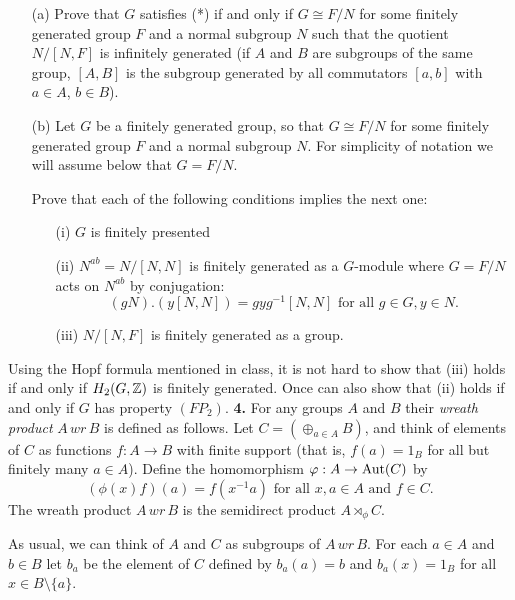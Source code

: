 \documentclass[12pt]{amsart}
\begin{document}
\begin{itemize}
\item[(a)] Prove that $G$ satisfies (*) if and only if $G\cong F/N$ for some finitely generated group $F$ and a normal subgroup $N$
such that the quotient $N/[N,F]$ is infinitely generated (if $A$ and $B$ are subgroups of the same group, $[A,B]$ is the subgroup
generated by all commutators $[a,b]$ with $a\in A$, $b\in B$).
\item[(b)] Let $G$ be a finitely generated group, so that $G\cong F/N$ for some finitely generated group $F$ and a normal subgroup $N$.
For simplicity of notation we will assume below that $G=F/N$.

\skv
\skv

Prove that each of the following conditions implies the next one:
\begin{itemize}
\item[(i)] $G$ is finitely presented
\item[(ii)] $N^{ab}=N/[N,N]$ is finitely generated as a $G$-module where $G=F/N$ acts on $N^{ab}$ by conjugation:
$$(gN).(y[N,N])=gyg^{-1}[N,N]\mbox{ for all }g\in G, y\in N.$$
\item[(iii)] $N/[N,F]$ is finitely generated as a group.
\end{itemize}
\end{itemize}
Using the Hopf formula mentioned in class, it is not hard to show that (iii) holds if and only if $H_2(G,{\mathbb Z})$ is finitely generated.
Once can also show that (ii) holds if and only if $G$ has property $(FP_2)$.
\skv
{\bf 4. } For any groups $A$ and $B$ their {\it wreath product} $A\, wr\, B$ is defined as follows.
Let $C=(\oplus_{a\in A}B)$, and think of elements of $C$ as functions $f:A\to B$ with finite support (that is, $f(a)=1_B$ for all but finitely many $a\in A$).
Define the homomorphism ${\varphi}:A\to {\rm Aut}(C)$ by $$(\phi(x)f)(a)=f(x^{-1}a) \mbox{ for all } x,a\in A \mbox{ and }f\in C.$$ 
The wreath product $A\, wr\, B$ is the semidirect product $A\rtimes_{\phi} C$.

As usual, we can think of $A$ and $C$ as subgroups of $A\, wr\, B$. For each $a\in A$ and $b\in B$ let $b_a$ be the element of $C$
defined by $b_a(a)=b$ and $b_a(x)=1_B$ for all $x\in B\setminus \{a\}$.
\end{document}
